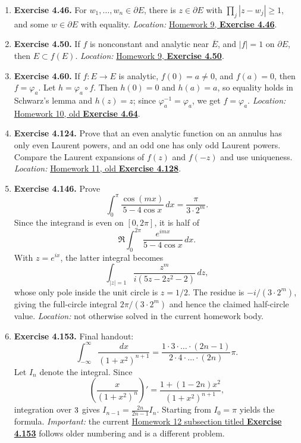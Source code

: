 \documentclass{article}
\begin{document}
\begin{enumerate}
  \item \textbf{Exercise 4.46.}
  For $w_1,\ldots,w_n\in\partial E$, there is $z\in\partial E$ with
  $\prod_j|z-w_j|\ge1$, and some $w\in\partial E$ with equality.
  \textit{Location:}
  \hyperref[sec:ca-ex-4-46]{Homework 9, \textbf{Exercise 4.46}}.

  \item \textbf{Exercise 4.50.}
  If $f$ is nonconstant and analytic near $\overline E$, and $|f|=1$ on
  $\partial E$, then $E\subset f(E)$.
  \textit{Location:}
  \hyperref[sec:ca-ex-4-50]{Homework 9, \textbf{Exercise 4.50}}.

  \item \textbf{Exercise 4.60.}
  If $f:E\to E$ is analytic, $f(0)=a\ne0$, and $f(a)=0$, then
  $f=\varphi_a$.  Let $h=\varphi_a\circ f$.  Then $h(0)=0$ and $h(a)=a$, so
  equality holds in Schwarz's lemma and $h(z)=z$; since $\varphi_a^{-1}=\varphi_a$,
  we get $f=\varphi_a$.
  \textit{Location:}
  \hyperref[sec:ca-ex-4-64]{Homework 10, old \textbf{Exercise 4.64}}.

  \item \textbf{Exercise 4.124.}
  Prove that an even analytic function on an annulus has only even Laurent
  powers, and an odd one has only odd Laurent powers.  Compare the Laurent
  expansions of $f(z)$ and $f(-z)$ and use uniqueness.
  \textit{Location:}
  \hyperref[sec:ca-ex-4-128]{Homework 11, old \textbf{Exercise 4.128}}.

  \item \textbf{Exercise 4.146.}
  Prove
  \[
    \int_0^\pi\frac{\cos(mx)}{5-4\cos x}\,dx=\frac{\pi}{3\cdot2^m}.
  \]
  Since the integrand is even on $[0,2\pi]$, it is half of
  \[
    \Re\int_0^{2\pi}\frac{e^{imx}}{5-4\cos x}\,dx.
  \]
  With $z=e^{ix}$, the latter integral becomes
  \[
    \int_{|z|=1}\frac{z^m}{i(5z-2z^2-2)}\,dz,
  \]
  whose only pole inside the unit circle is $z=1/2$.  The residue is
  $-i/(3\cdot2^m)$, giving the full-circle integral
  $2\pi/(3\cdot2^m)$ and hence the claimed half-circle value.
  \textit{Location:} not otherwise solved in the current homework body.

  \item \textbf{Exercise 4.153.}
  Final handout:
  \[
    \int_{-\infty}^{\infty}\frac{dx}{(1+x^2)^{n+1}}
    =
    \frac{1\cdot3\cdot\ldots\cdot(2n-1)}
         {2\cdot4\cdot\ldots\cdot(2n)}\pi.
  \]
  Let $I_n$ denote the integral.  Since
  \[
    \left(\frac{x}{(1+x^2)^n}\right)'
    =\frac{1+(1-2n)x^2}{(1+x^2)^{n+1}},
  \]
  integration over $3$ gives
  $I_{n-1}=\frac{2n}{2n-1}I_n$.  Starting from $I_0=\pi$ yields the formula.
  \textit{Important:} the current
  \hyperref[sec:ca-ex-4-153-old]{Homework 12 subsection titled
  \textbf{Exercise 4.153}} follows older numbering and is a different problem.


\end{enumerate}
\end{document}

